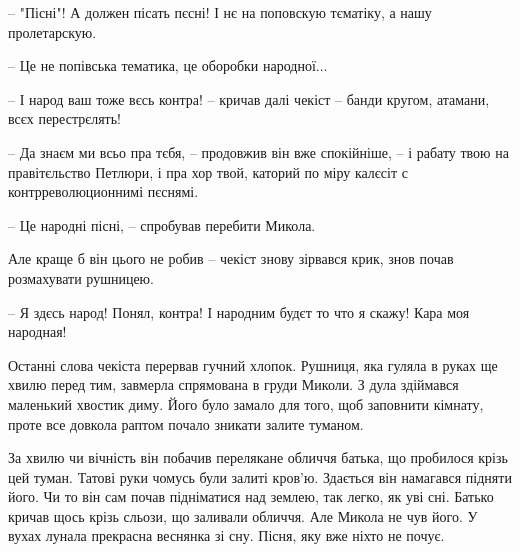 – "Пісні"! А должен пісать пєсні! І нє на поповскую тєматіку, а нашу пролетарскую. 

 – Це не попівська тематика, це оборобки народної...

– І народ ваш тоже вєсь контра! – кричав далі чекіст – банди кругом, атамани, всєх перестрєлять!

– Да знаєм ми всьо пра тєбя, – продовжив він вже спокійніше, – і рабату твою на
правітєльство Петлюри, і пра хор твой, каторий по міру калєсіт с
контрреволюционнимі пєснямі.

– Це народні пісні, – спробував перебити Микола.

Але краще б він цього не робив – чекіст знову зірвався крик, знов почав
розмахувати рушницею.

– Я здєсь народ! Понял, контра! І народним будєт то что я скажу! Кара моя
народная!

Останні слова чекіста перервав гучний хлопок. Рушниця, яка гуляла в руках ще
хвилю перед тим, завмерла спрямована в груди Миколи. З дула здіймався маленький
хвостик диму. Його було замало для того, щоб заповнити кімнату, проте все
довкола раптом почало зникати залите туманом.

За хвилю чи вічність він побачив перелякане обличчя батька, що пробилося крізь
цей туман. Татові руки чомусь були залиті кров'ю. Здається він намагався
підняти його. Чи то він сам почав підніматися над землею, так легко, як уві
сні. Батько кричав щось крізь сльози, що заливали обличчя. Але Микола не чув
його. У вухах лунала прекрасна веснянка зі сну. Пісня, яку вже ніхто не почує.
